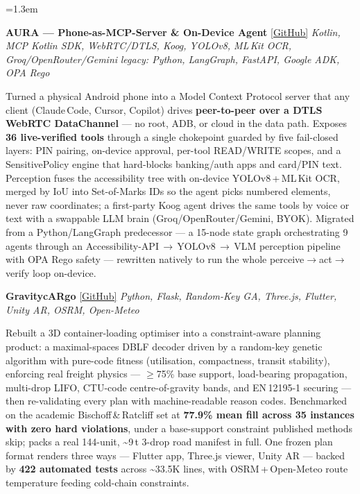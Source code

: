 \documentclass[8pt, a4paper]{article}
\newcommand{\projentry}[3]{%
  \noindent\textbf{\small #1}\enspace
  {\footnotesize\href{#2}{[GitHub]}}\enspace
  {\small\textemdash\enspace\textit{#3}}\par\vspace{-1pt}%
}
\newenvironment{projlist}{%
  \begin{list}{}{%
    \leftmargin=1.3em\itemindent=0pt
    \topsep=0pt\partopsep=0pt\parsep=0pt\itemsep=1.5pt}%
}{%
  \end{list}%
}
\newcommand{\desc}[1]{{\footnotesize #1}}
\begin{document}
\begin{projlist}
  \item \projentry{AURA --- Phone-as-MCP-Server \& On-Device Agent}{https://github.com/Dinesh210805/aura-live-mcp}%
                  {Kotlin, MCP Kotlin SDK, WebRTC/DTLS, Koog, YOLOv8, ML\,Kit OCR, Groq/OpenRouter/Gemini\,\textbullet\,legacy: Python, LangGraph, FastAPI, Google ADK, OPA Rego}
  \desc{Turned a physical Android phone into a Model Context Protocol server that any
  client (Claude\,Code, Cursor, Copilot) drives \textbf{peer-to-peer over a DTLS WebRTC
  DataChannel} --- no root, ADB, or cloud in the data path. Exposes \textbf{36 live-verified
  tools} through a single chokepoint guarded by five fail-closed layers: PIN pairing,
  on-device approval, per-tool READ/WRITE scopes, and a SensitivePolicy engine that
  hard-blocks banking/auth apps and card/PIN text. Perception fuses the accessibility tree
  with on-device YOLOv8\,+\,ML\,Kit OCR, merged by IoU into Set-of-Marks IDs so the agent
  picks numbered elements, never raw coordinates; a first-party Koog agent drives the same
  tools by voice or text with a swappable LLM brain (Groq/OpenRouter/Gemini, BYOK).
  Migrated from a Python/LangGraph predecessor --- a 15-node state graph orchestrating 9
  agents through an Accessibility-API\,$\to$\,YOLOv8\,$\to$\,VLM perception pipeline with OPA
  Rego safety --- rewritten natively to run the whole perceive$\to$act$\to$verify loop on-device.}

  \item \projentry{GravitycARgo}{https://github.com/Dinesh210805/GravitycARgo}%
                  {Python, Flask, Random-Key GA, Three.js, Flutter, Unity AR, OSRM, Open-Meteo}
  \desc{Rebuilt a 3D container-loading optimiser into a constraint-aware planning product:
  a maximal-spaces DBLF decoder driven by a random-key genetic algorithm with pure-code
  fitness (utilisation, compactness, transit stability), enforcing real freight physics ---
  $\geq$75\% base support, load-bearing propagation, multi-drop LIFO, CTU-code
  centre-of-gravity bands, and EN\,12195-1 securing --- then re-validating every plan with
  machine-readable reason codes. Benchmarked on the academic Bischoff\,\&\,Ratcliff set at
  \textbf{77.9\% mean fill across 35 instances with zero hard violations}, under a
  base-support constraint published methods skip; packs a real 144-unit, \textasciitilde9\,t
  3-drop road manifest in full. One frozen plan format renders three ways --- Flutter app,
  Three.js viewer, Unity AR --- backed by \textbf{422 automated tests} across
  \textasciitilde33.5K lines, with OSRM\,+\,Open-Meteo route temperature feeding cold-chain
  constraints.}
\end{projlist}
\end{document}
